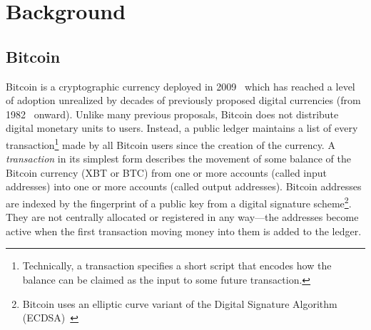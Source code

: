 


\section{Background}
\subsection{Bitcoin}
Bitcoin is a cryptographic currency deployed in 2009~\cite{Nak08} which has reached a level of adoption unrealized by decades of previously proposed digital currencies (from 1982~\cite{Cha82} onward). Unlike many previous proposals, Bitcoin does not distribute digital monetary units to users. Instead, a public ledger maintains a list of every transaction\footnote{Technically, a transaction specifies a short script that encodes how the balance can be claimed as the input to some future transaction.} made by all Bitcoin users since the creation of the currency. A \textit{transaction} in its simplest form describes the movement of some balance of the Bitcoin currency (XBT or BTC) from one or more accounts (called input addresses) into one or more accounts (called output addresses). Bitcoin addresses are indexed by the fingerprint of a public key from a digital signature scheme\footnote{Bitcoin uses an elliptic curve variant of the Digital Signature Algorithm (ECDSA)~\cite{ecdsa}}. They are not centrally allocated or registered in any way---the addresses become active when the first transaction moving money into them is added to the ledger. 


